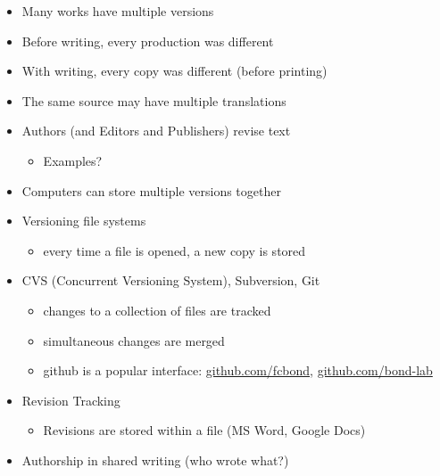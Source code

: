 \documentclass[a4paper,landscape,headrule,footrule,xetex]{foils}
\begin{document}
\begin{itemize}
\item Many works have multiple versions
\item Before writing, every production was different
\item With writing, every copy was different (before printing)
\item The same source may have multiple translations
\item Authors (and Editors and Publishers) revise text
  \begin{itemize}
  \item Examples?
  \end{itemize}
\item Computers can store multiple versions together
\end{itemize}



\begin{itemize}
\item Versioning file systems
  \begin{itemize}
  \item  every time a file is opened, a new copy is stored
  \end{itemize}
\item CVS (Concurrent Versioning System), Subversion, Git
  \begin{itemize}
  \item changes to a collection of files are tracked
  \item simultaneous changes are merged
  \item github is a popular interface:
    \href{https://github.com/fcbond}{github.com/fcbond},
    \href{https://github.com/bond-lab}{github.com/bond-lab} 
  \end{itemize} 
\item Revision Tracking
  \begin{itemize} 
  \item Revisions are stored within a file (MS Word, Google Docs)
  \end{itemize}
\item Authorship in shared writing (who wrote what?)
\end{itemize}
\end{document}
